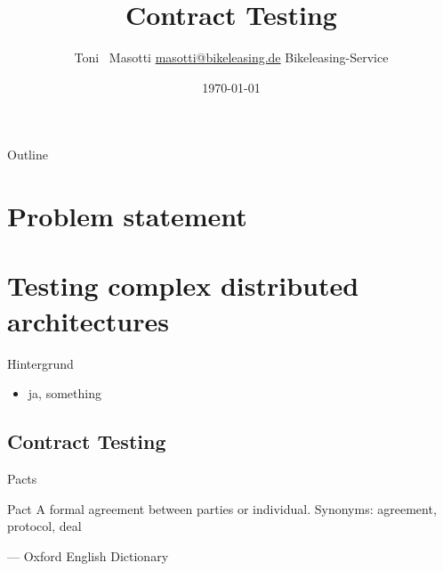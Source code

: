 


\title[Contract Testing]{Contract Testing }
\author[Toni Masotti]{\texorpdfstring{Toni ~Masotti  \newline \url{masotti@bikeleasing.de} \newline Bikeleasing-Service}{Toni Masotti}}
\date{\today}




	\begin{frame}
		\maketitle
	\end{frame}

	\begin{frame}{Outline}
		\tableofcontents
	\end{frame}


	\AtBeginSection[ ]
	{
		\frame{\tableofcontents[currentsection]}
	}

	


	\section{Problem statement}

	


	\section{Testing complex distributed architectures}
	\begin{frame}{Hintergrund}

		\begin{itemize}
			\item ja, something
		\end{itemize}

	\end{frame}


	\subsection{Contract Testing}
	\begin{frame}{Pacts}

	\begin{block}{Pact}
A formal agreement between parties or individual. Synonyms: agreement, protocol, deal

--- Oxford English Dictionary
\end{block}

	\end{frame}



